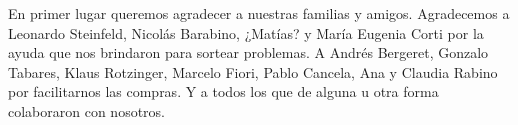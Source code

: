 
\begin{acknowledgments}

En primer lugar queremos agradecer a nuestras familias y amigos. Agradecemos a Leonardo Steinfeld, Nicol\' as Barabino, ¿Mat\'ias? y Mar\'ia Eugenia Corti por la ayuda que nos brindaron para sortear problemas. A Andr\'es Bergeret, Gonzalo Tabares, Klaus Rotzinger, Marcelo Fiori, Pablo Cancela, Ana y Claudia Rabino por facilitarnos las compras. Y a todos los que de alguna u otra forma colaboraron con nosotros.

\end{acknowledgments}
